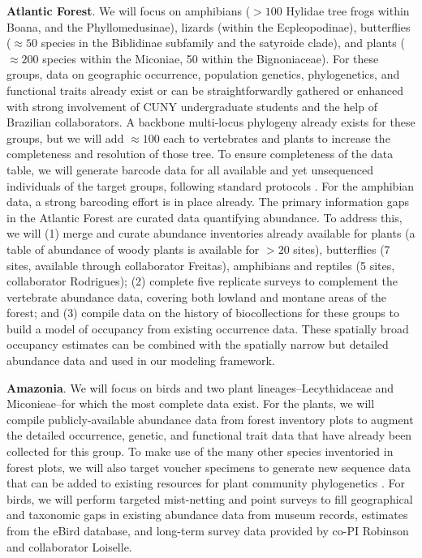 \documentclass[11pt]{article}
\begin{document}
\textbf{Atlantic Forest}. We will focus on amphibians ($> 100$ Hylidae
tree frogs within Boana, and the Phyllomedusinae), lizards (within the
Ecpleopodinae), butterflies ($\approx 50$ species in the Biblidinae
subfamily and the satyroide clade), and plants ($\approx 200$ species
within the Miconiae, 50 within the Bignoniaceae). For these groups,
data on geographic occurrence, population genetics, phylogenetics, and
functional traits already exist or can be straightforwardly gathered
or enhanced with strong involvement of CUNY undergraduate students and
the help of Brazilian collaborators. A backbone multi-locus phylogeny
already exists for these groups, but we will add $\approx 100$ each to
vertebrates and plants to increase the completeness and resolution of
those tree. To ensure completeness of the data table, we will generate
barcode data for all available and yet unsequenced individuals of the
target groups, following standard protocols \cite{che2012,
  Krehenwinkel2017-zk, bi2018chloroplast}. For the amphibian data, a
strong barcoding effort is in place already.  The primary information
gaps in the Atlantic Forest are curated data quantifying abundance. To
address this, we will (1) merge and curate abundance inventories
already available for plants (a table of abundance of woody plants is
available for $> 20$ sites), butterflies (7 sites, available through
collaborator Freitas), amphibians and reptiles (5 sites, collaborator
Rodrigues); (2) complete five replicate surveys to complement the
vertebrate abundance data, covering both lowland and montane areas of
the forest; and (3) compile data on the history of biocollections for
these groups to build a model of occupancy from existing occurrence
data. These spatially broad occupancy estimates can be combined with
the spatially narrow but detailed abundance data and used in our
modeling framework.

\textbf{Amazonia}. We will focus on birds and two plant
lineages--Lecythidaceae and Miconieae--for which the most complete
data exist. For the plants, we will compile publicly-available
abundance data from forest inventory plots
\cite{Lopez-Gonzalez2011-wr, Ter_Steege2011-yr, Rainfor2018-so} to
augment the detailed occurrence, genetic, and functional trait data
that have already been collected for this group. To make use of the
many other species inventoried in forest plots, we will also target
voucher specimens to generate new sequence data that can be added to
existing resources for plant community phylogenetics
\cite{webb2008phylocom, Harmon2013-wb}.  For birds, we will perform
targeted mist-netting and point surveys to fill geographical and
taxonomic gaps in existing abundance data from museum records,
estimates from the eBird database, and long-term survey data provided
by co-PI Robinson and collaborator Loiselle.
\end{document}
